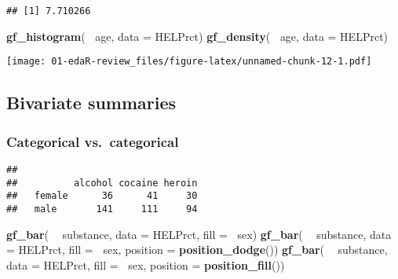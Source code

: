 \documentclass[]{article}
\newenvironment{Shaded}{\begin{snugshade}}{\end{snugshade}}
\newcommand{\KeywordTok}[1]{\textcolor[rgb]{0.13,0.29,0.53}{\textbf{#1}}}
\newcommand{\DataTypeTok}[1]{\textcolor[rgb]{0.13,0.29,0.53}{#1}}
\newcommand{\StringTok}[1]{\textcolor[rgb]{0.31,0.60,0.02}{#1}}
\newcommand{\OperatorTok}[1]{\textcolor[rgb]{0.81,0.36,0.00}{\textbf{#1}}}
\newcommand{\NormalTok}[1]{#1}
\begin{document}
\begin{Shaded}
\end{Shaded}

\begin{verbatim}
## [1] 7.710266
\end{verbatim}

\begin{Shaded}
\begin{Highlighting}[]
\KeywordTok{gf_histogram}\NormalTok{(}\OperatorTok{~}\StringTok{ }\NormalTok{age, }\DataTypeTok{data =}\NormalTok{ HELPrct)}
\KeywordTok{gf_density}\NormalTok{(}\OperatorTok{~}\StringTok{ }\NormalTok{age, }\DataTypeTok{data =}\NormalTok{ HELPrct)}
\end{Highlighting}
\end{Shaded}

\texttt{[image: 01-edaR-review\_files/figure-latex/unnamed-chunk-12-1.pdf]}

\subsection{Bivariate summaries}\label{bivariate-summaries}

\subsubsection{Categorical
vs.~categorical}\label{categorical-vs.categorical}

\begin{Shaded}
\end{Shaded}

\begin{verbatim}
##         
##          alcohol cocaine heroin
##   female      36      41     30
##   male       141     111     94
\end{verbatim}

\begin{Shaded}
\begin{Highlighting}[]
\KeywordTok{gf_bar}\NormalTok{( }\OperatorTok{~}\StringTok{ }\NormalTok{substance, }\DataTypeTok{data =}\NormalTok{ HELPrct, }\DataTypeTok{fill =} \OperatorTok{~}\NormalTok{sex)}
\KeywordTok{gf_bar}\NormalTok{( }\OperatorTok{~}\StringTok{ }\NormalTok{substance, }\DataTypeTok{data =}\NormalTok{ HELPrct, }\DataTypeTok{fill =} \OperatorTok{~}\NormalTok{sex, }\DataTypeTok{position =} \KeywordTok{position_dodge}\NormalTok{())}
\KeywordTok{gf_bar}\NormalTok{( }\OperatorTok{~}\StringTok{ }\NormalTok{substance, }\DataTypeTok{data =}\NormalTok{ HELPrct, }\DataTypeTok{fill =} \OperatorTok{~}\NormalTok{sex, }\DataTypeTok{position =} \KeywordTok{position_fill}\NormalTok{())}
\end{Highlighting}
\end{Shaded}
\end{document}

